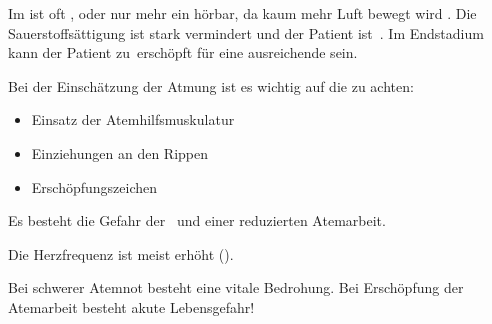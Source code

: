 {\begin{ABCDEText}
  Im  ist oft , oder nur mehr ein
   hörbar, da kaum mehr Luft bewegt
  wird . Die
  {\RedFlag}\,Sauerstoffsättigung ist stark vermindert und der
  Patient ist {\RedFlag}\,. Im Endstadium kann der 
  Patient zu {\RedFlag}\,erschöpft für eine ausreichende
   sein. 
  
  Bei der Einschätzung der Atmung ist es wichtig auf die
   zu
  achten:
  \begin{itemize}
    \item Einsatz der Atemhilfsmuskulatur
    \item Einziehungen an den Rippen
    \item Erschöpfungszeichen
  \end{itemize}
  Es besteht die Gefahr der {\RedFlag}\, und einer reduzierten Atemarbeit.
  \item[\ABCDE{C}] Die Herzfrequenz ist meist erhöht
  ().
%   
%   
  \item[\ABCDE{=}] Bei schwerer Atemnot besteht 
  eine vitale Bedrohung. Bei Erschöpfung der Atemarbeit
  besteht akute Lebensgefahr!
\end{ABCDEText}
}
